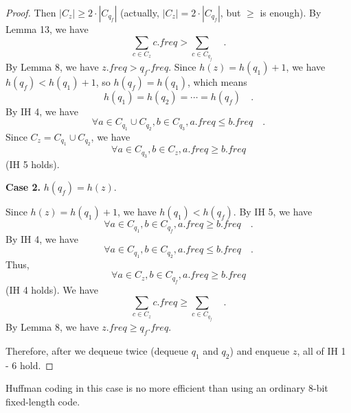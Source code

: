 \begin{proof}
    Then $|C_z| \geq 2 \cdot |C_{q_f}|$
    (actually, $|C_z| = 2 \cdot |C_{q_f}|$, but $\geq$ is enough).
    By Lemma 13, we have 
    \begin{equation*}
        \sum\limits_{c \in C_z} c.freq > \sum\limits_{c \in C_{q_f}}
        \quad .
    \end{equation*}
    By Lemma 8, we have $z.freq > q_f.freq$.
    Since $h(z) = h(q_1) + 1$, we have $h(q_f) < h(q_1) + 1$, so $h(q_f) = h(q_1)$,
    which means
    \begin{equation*}
        h(q_1) = h(q_2) = \cdots = h(q_f)
        \quad .
    \end{equation*}
    By IH 4, we have
    \begin{equation*}
        \forall a \in C_{q_1} \cup C_{q_2}, b \in C_{q_3}, a.freq \leq b.freq
        \quad .
    \end{equation*}
    Since $C_z = C_{q_1} \cup C_{q_2}$, we have 
    \begin{equation*}
        \forall a \in C_{q_3}, b \in C_z, a.freq \geq b.freq
    \end{equation*}
    (IH 5 holds).

    \textbf{Case 2.}
    $h(q_f) = h(z)$.

    Since $h(z) = h(q_1) + 1$,
    we have $h(q_1) < h(q_f)$.
    By IH 5, we have 
    \begin{equation*}
        \forall a \in C_{q_1}, b \in C_{q_f}, a.freq \geq b.freq
        \quad .
    \end{equation*}
    By IH 4, we have
    \begin{equation*}
        \forall a \in C_{q_1}, b \in C_{q_2}, a.freq \leq b.freq
        \quad .
    \end{equation*}
    Thus,
    \begin{equation*}
        \forall a \in C_z, b \in C_{q_f}, a.freq \geq b.freq
    \end{equation*}
    (IH 4 holds).
    We have 
    \begin{equation*}
        \sum\limits_{c \in C_z} c.freq \geq \sum\limits_{c \in C_{q_f}}
        \quad .
    \end{equation*}
    By Lemma 8, we have $z.freq \geq q_f.freq$. 

    Therefore, after we dequeue twice (dequeue $q_1$ and $q_2$)
    and enqueue $z$, all of IH 1 - 6 hold.
\end{proof}

\begin{claim}
    Huffman coding in this case is no more efficient than
    using an ordinary 8-bit fixed-length code.
\end{claim}

